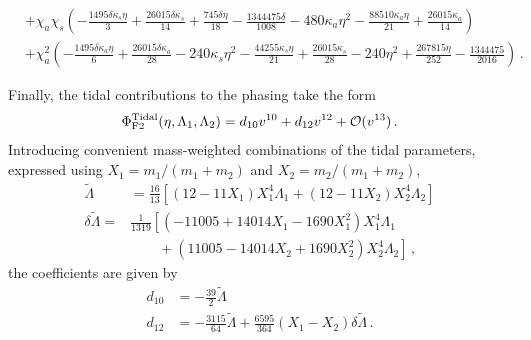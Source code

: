 \documentclass[prd,aps,letter,twocolumn,floatfix,notitlepage,nofootinbib]{revtex4-1}
\begin{document}
\begin{widetext}
\begin{align}
	& + \chi_a   \chi_s  \left(-\frac{1495 \delta   \kappa_s  \eta }{3}+\frac{26015 \delta   \kappa_s }{14}+\frac{745 \delta  \eta }{18}-\frac{1344475 \delta }{1008}-480  \kappa_a  \eta ^2-\frac{88510  \kappa_a  \eta }{21}+\frac{26015  \kappa_a }{14}\right) \nonumber\\
	& + \chi_a ^2 \left(-\frac{1495 \delta   \kappa_a  \eta }{6}+\frac{26015 \delta   \kappa_a }{28}-240  \kappa_s  \eta ^2-\frac{44255  \kappa_s  \eta }{21}+\frac{26015  \kappa_s }{28}-240 \eta ^2+\frac{267815 \eta }{252}-\frac{1344475}{2016}\right)\,.
\end{align}
\end{widetext}

Finally, the tidal contributions to the phasing take the form~\cite{VinesFlanaganHinderer2011}
\begin{equation}
	\Phi_{\rm F2}^{\rm Tidal}(\eta, \Lambda_{1}, \Lambda_{2}) = d_{10} v^{10} + d_{12} v^{12} + \mathcal{O}(v^{13}) \,.
\end{equation}
Introducing convenient mass-weighted combinations of the tidal parameters, expressed using $X_{1} = m_{1}/(m_{1} + m_{2})$ and $X_{2} = m_{2}/(m_{1} + m_{2})$,
\begin{align}
	\tilde\Lambda &= \frac{16}{13} \left[(12 - 11 X_1)X_1^4\Lambda_1 + (12 - 11 X_2)X_2^4\Lambda_2 \right] \nonumber\\
	\delta\tilde\Lambda =& \frac{1}{1319} \left[(-11005 + 14014 X_1 - 1690 X_{1}^{2})X_1^4\Lambda_1 \right. \nonumber\\ 
	& \left. \quad\quad + (11005 - 14014 X_2 + 1690 X_{2}^{2}) X_2^4\Lambda_2 \right] \,,
\end{align}
the coefficients are given by
\begin{align}
	d_{10} &= -\frac{39}{2}\tilde\Lambda \nonumber\\
	d_{12} &= -\frac{3115}{64}\tilde\Lambda + \frac{6595}{364}(X_1-X_2)\delta\tilde\Lambda \,.
\end{align}

  
\end{document}

